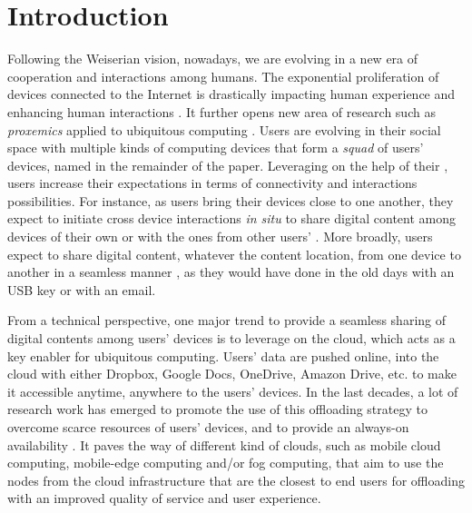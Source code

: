 \section{Introduction}

Following the Weiserian vision, nowadays, we are
evolving in a new era of cooperation and interactions among humans.
The exponential proliferation of devices connected to the Internet is
drastically impacting human experience and enhancing human
interactions \cite{Dearman:2008, Oh:2017, Sohn:2008,Harper08}. It further opens new area of research such as
\textit{proxemics} applied to ubiquitous computing
\cite{Marquardt:2011}. Users are evolving in their social space with 
multiple kinds of computing devices that form a \textit{squad} of users'
devices, named \squad in the remainder of the
paper. Leveraging on the help of their \squad, users increase
their expectations in terms of connectivity and interactions
possibilities. For instance, as users bring
their devices close to one another, they expect to initiate cross
device interactions \textit{in situ} to share digital content
\cite{Oh:2017} among devices of their own \squad or with the ones 
from other users' \squad. More broadly, users expect to share digital content,
whatever the content location, from one
device to another in a seamless manner \cite{Dearman:2008}, as they
would have done in the old days with an USB key or with an email. 

From a technical perspective, one major trend to provide a seamless
sharing of digital contents among users' devices is to leverage on the
cloud, which acts as a key enabler for ubiquitous computing. Users' data
are pushed online, into the cloud with either Dropbox, Google Docs,
OneDrive, Amazon Drive, etc. to make it accessible anytime,
anywhere to the users' devices.  In the last decades, a lot of research work has
emerged to promote the use of this offloading strategy to overcome scarce
resources of users' devices, and to provide an always-on availability
\cite{Zhang:2014,Gordon:2012,Chun:2011}. It paves the way of different kind
of clouds, such as mobile cloud computing, mobile-edge computing
and/or fog computing, that aim to use the nodes from the cloud
infrastructure that are the closest to end users
for offloading with an improved quality of service and user experience.

